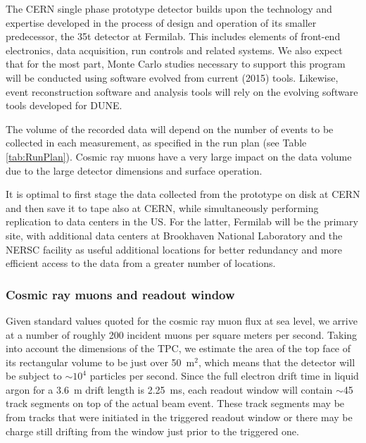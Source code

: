 \label{computing}

The CERN single phase prototype detector builds upon the technology and expertise developed in the
process of design and operation of its smaller predecessor, the 35t detector at Fermilab.
This includes elements of front-end electronics, data acquisition, run controls and related systems. We also expect that for the most part,
Monte Carlo studies necessary to support this program will be conducted using software evolved from current (2015) tools. Likewise,
event reconstruction software and analysis tools will rely on the evolving software tools developed for DUNE.

The volume of the recorded data  will depend on the number of events to be collected in each measurement,
as specified in the run plan (see Table \ref{tab:RunPlan}).
Cosmic ray muons have a very large impact on the data volume due to the large detector dimensions and surface operation.

It is optimal to first stage the data collected from the prototype on disk at CERN and then save it to tape also at CERN,
while simultaneously performing replication to data centers in the US. For the latter, Fermilab will be the primary site, with additional data centers at Brookhaven National Laboratory and the NERSC facility as useful additional locations for better redundancy and more efficient access to the data from a greater number of locations.



\subsubsection{Cosmic ray muons and readout window}
\label{readout_windows}

Given standard values quoted for the cosmic ray muon flux at sea level, we arrive at a number of roughly 200 incident muons
per square meters per second.
Taking into account the dimensions of the TPC, we estimate the area of the top face of its rectangular volume to be just over 50~m$^{2}$,
which means that the detector will be subject to $\sim10^{4}$ particles per second.
Since the full electron drift time in liquid argon for a 3.6~m drift length is 2.25~ms, each readout window will contain 
$\sim$45 track segments on top of the actual beam event. These track segments may be from tracks that were initiated in the triggered
readout window or there may be charge still drifting from the window just prior to the triggered one.


